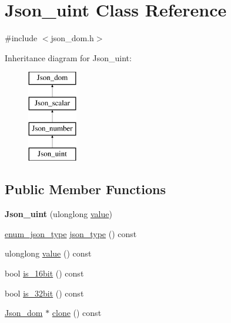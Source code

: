 \hypertarget{classJson__uint}{}\section{Json\+\_\+uint Class Reference}
\label{classJson__uint}


{\ttfamily \#include $<$json\+\_\+dom.\+h$>$}

Inheritance diagram for Json\+\_\+uint\+:\begin{figure}[H]
\begin{center}
\leavevmode
\includegraphics[height=4.000000cm]{classJson__uint}
\end{center}
\end{figure}
\subsection*{Public Member Functions}
\begin{DoxyCompactItemize}
\item 
\mbox{\label{classJson__uint_a2e7b72a1884eb41de225f3849a4728da}} 
{\bfseries Json\+\_\+uint} (ulonglong \mbox{\hyperlink{classJson__uint_a50765d292cd254e77518ab42c4a3e2c4}{value}})
\item 
\mbox{\hyperlink{classJson__dom_af37eed7dfe1da1d6507d3ab85320eb03}{enum\+\_\+json\+\_\+type}} \mbox{\hyperlink{classJson__uint_abd22e524380fa02063f5ae9062ff742e}{json\+\_\+type}} () const
\item 
ulonglong \mbox{\hyperlink{classJson__uint_a50765d292cd254e77518ab42c4a3e2c4}{value}} () const
\item 
bool \mbox{\hyperlink{classJson__uint_a800710255a621f78f3bae3f066e8a1ec}{is\+\_\+16bit}} () const
\item 
bool \mbox{\hyperlink{classJson__uint_af1bc8090273ccd300a0dd0bd37f11c0e}{is\+\_\+32bit}} () const
\item 
\mbox{\hyperlink{classJson__dom}{Json\+\_\+dom}} $\ast$ \mbox{\hyperlink{classJson__uint_acdc931eba3b28293ca6e16d698732d42}{clone}} () const
\end{DoxyCompactItemize}
